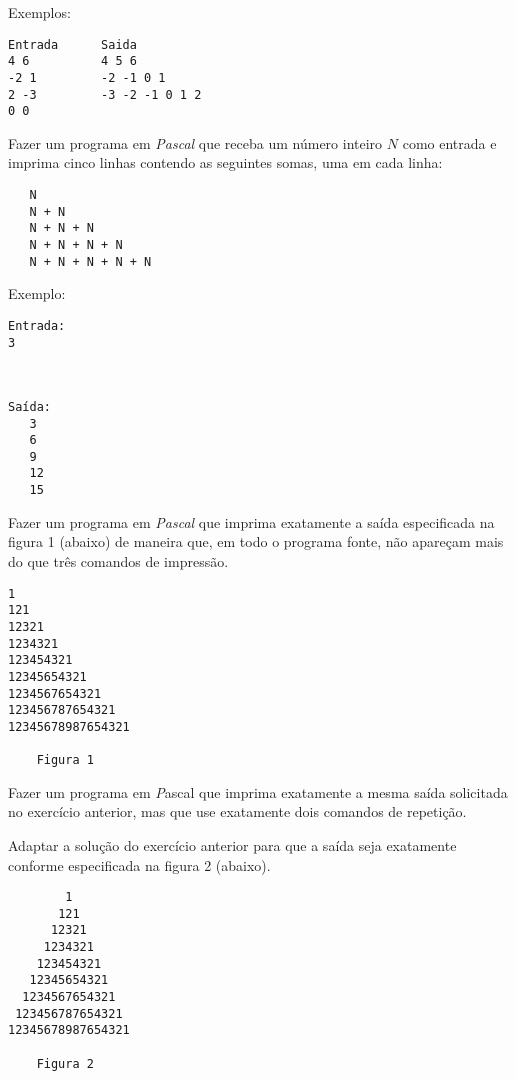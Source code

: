 Exemplos:
\begin{verbatim}
Entrada      Saida
4 6          4 5 6
-2 1         -2 -1 0 1
2 -3         -3 -2 -1 0 1 2
0 0 
\end{verbatim}


\item  Fazer um programa em \emph{Pascal} que receba um
   número inteiro $N$ como entrada e imprima cinco linhas
contendo as seguintes somas, uma em cada linha:

\begin{verbatim}
   N
   N + N
   N + N + N
   N + N + N + N
   N + N + N + N + N
\end{verbatim}

Exemplo:

\begin{minipage}{5cm}
\begin{verbatim}
Entrada:
3
\end{verbatim}
\end{minipage} \
\begin{minipage}{5cm}
\begin{verbatim}
Saída:
   3
   6
   9
   12
   15
\end{verbatim}
\end{minipage}

\item Fazer um programa em \emph{Pascal} que imprima
  exatamente a saída especificada na figura 1 (abaixo) de maneira que,
  em todo o programa fonte, não apareçam mais do que três comandos de impressão.

\begin{center}
\begin{minipage}{5cm}
\begin{verbatim}
1
121
12321
1234321
123454321
12345654321
1234567654321
123456787654321
12345678987654321

    Figura 1
\end{verbatim}
\end{minipage}
\end{center}

\item Fazer um programa em {\emph Pascal} que imprima
  exatamente a mesma saída solicitada no exercício anterior, mas que
  use exatamente dois comandos de repetição.

\item Adaptar a solução do exercício anterior para que a saída seja
  exatamente conforme especificada na figura 2 (abaixo).

\begin{center}
\begin{minipage}{5cm}
\begin{verbatim}
        1
       121
      12321
     1234321
    123454321
   12345654321
  1234567654321
 123456787654321
12345678987654321

    Figura 2
\end{verbatim}
\end{minipage}
\end{center}

